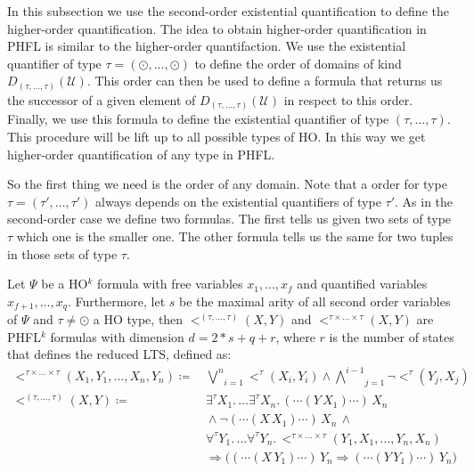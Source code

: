 In this subsection we use the second-order existential quantification to define the higher-order
quantification. The idea to obtain higher-order quantification in PHFL is similar to the higher-order quantifaction.
We use the existential quantifier of type $\tau = (\odot, \dots, \odot)$ to define the order of domains of kind
$D_{(\tau, \dots, \tau)}(\mathcal{U})$. This order can then be used to define a formula that returns us the successor
of a given element of $D_{(\tau, \dots, \tau)}(\mathcal{U})$ in respect to this order. Finally, we use this
formula to define the existential quantifier of type $(\tau, \dots, \tau)$. This procedure will be lift up to all
possible types of HO. In this way we get higher-order quantification of any type in PHFL.

So the first thing we need is the order of any domain. Note that a order for type $\tau = (\tau', \dots, \tau')$ always
depends on the existential quantifiers of type $\tau'$. As in the second-order case we define two formulas. The first
tells us given two sets of type $\tau$ which one is the smaller one. The other formula tells us the same for two
tuples in those sets of type $\tau$.

\begin{definition}
    \label{definition:lower_bound_less_higher}
    Let $\Psi$ be a HO$^k$ formula with free variables $x_1, \dots, x_f$ and quantified variables $x_{f+1}, \dots,
    x_q$. Furthermore, let $s$ be the maximal arity of all second order variables of $\Psi$ and $\tau \neq \odot$ a HO
    type, then $<^{(\tau, \dots, \tau)}(X, Y)$ and $<^{\tau \times \dots \times \tau}(X, Y)$ are PHFL$^k$ formulas
    with dimension $d = 2 * s + q + r$, where $r$ is the number of states that defines the reduced LTS, defined as:
    \begin{align*}
        <^{\tau \times \dots \times \tau}(X_1, Y_1, \dots, X_n, Y_n) \coloneqq &\,\underset{i =
        1}{\overset{n}{\bigvee}}<^{\tau}(X_i, Y_i) \wedge \underset{j = 1}{\overset{i - 1}{\bigwedge}}
        \neg <^{\tau}(Y_j, X_j)\\
        <^{(\tau, \dots, \tau)}(X, Y) \coloneqq &\,\exists^{\tau}X_1. \,\dots \exists^{\tau}X_n.\,(\dotsb(Y\,X_1)\dotsb)\,X_n\\
        &\,\wedge \neg (\dotsb(X\,X_1) \dotsb)\,X_n\,\wedge \\&\,\forall^{\tau}Y_1. \,\dots
        \forall^{\tau}Y_n.\,<^{\tau \times \dots \times \tau}
        (Y_1, X_1, \dots, Y_n, X_n) \\&\,\Rightarrow \big((\dotsb(X\,Y_1) \dotsb)\,Y_n \Rightarrow (\dotsb(Y\,Y_1)
         \dotsb)\,Y_n\big)
    \end{align*}
\end{definition}

